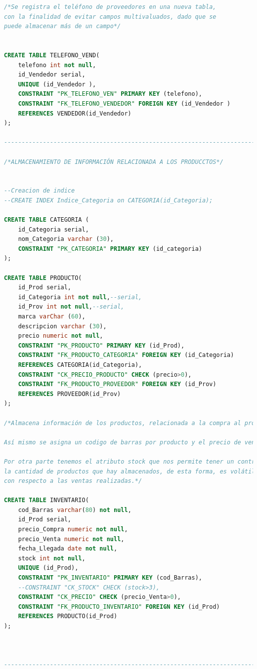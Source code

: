 \documentclass[30pt,fleqn]{article}
\begin{document}
\begin{lstlisting}[language=sql, caption={DDL.Estructura de base de datos Papelería. }]
/*Se registra el teléfono de proveedores en una nueva tabla, 
con la finalidad de evitar campos multivaluados, dado que se
puede almacenar más de un campo*/


CREATE TABLE TELEFONO_VEND(
	telefono int not null,
	id_Vendedor serial,
	UNIQUE (id_Vendedor ),
	CONSTRAINT "PK_TELEFONO_VEN" PRIMARY KEY (telefono),
	CONSTRAINT "FK_TELEFONO_VENDEDOR" FOREIGN KEY (id_Vendedor )
	REFERENCES VENDEDOR(id_Vendedor)
);

--------------------------------------------------------------------------------

/*ALMACENAMIENTO DE INFORMACIÓN RELACIONADA A LOS PRODUCCTOS*/


--Creacion de indice
--CREATE INDEX Indice_Categoria on CATEGORIA(id_Categoria);

CREATE TABLE CATEGORIA (
	id_Categoria serial,
	nom_Categoria varchar (30),
	CONSTRAINT "PK_CATEGORIA" PRIMARY KEY (id_categoria)
);

CREATE TABLE PRODUCTO(
	id_Prod serial,
	id_Categoria int not null,--serial,
	id_Prov int not null,--serial,
	marca varChar (60),
	descripcion varchar (30),
	precio numeric not null,
	CONSTRAINT "PK_PRODUCTO" PRIMARY KEY (id_Prod),
    CONSTRAINT "FK_PRODUCTO_CATEGORIA" FOREIGN KEY (id_Categoria)
	REFERENCES CATEGORIA(id_Categoria),
	CONSTRAINT "CK_PRECIO_PRODUCTO" CHECK (precio>0),
	CONSTRAINT "FK_PRODUCTO_PROVEEDOR" FOREIGN KEY (id_Prov)
	REFERENCES PROVEEDOR(id_Prov)
);

/*Almacena información de los productos, relacionada a la compra al proveedor.

Así mismo se asigna un codigo de barras por producto y el precio de venta al cliente.

Por otra parte tenemos el atributo stock que nos permite tener un control sobre 
la cantidad de productos que hay almacenados, de esta forma, es volátil y cambia
con respecto a las ventas realizadas.*/

CREATE TABLE INVENTARIO(
	cod_Barras varchar(80) not null,
	id_Prod serial,
	precio_Compra numeric not null,
	precio_Venta numeric not null,
	fecha_Llegada date not null,
	stock int not null,
	UNIQUE (id_Prod),
	CONSTRAINT "PK_INVENTARIO" PRIMARY KEY (cod_Barras),
	--CONSTRAINT "CK_STOCK" CHECK (stock>3),
	CONSTRAINT "CK_PRECIO" CHECK (precio_Venta>0),
	CONSTRAINT "FK_PRODUCTO_INVENTARIO" FOREIGN KEY (id_Prod)
	REFERENCES PRODUCTO(id_Prod)
);



--------------------------------------------------------------------------------


\end{lstlisting}
\end{document}
